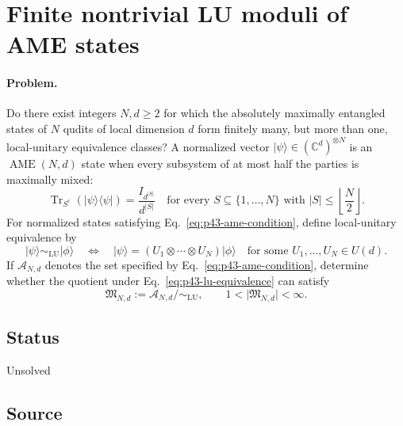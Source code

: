\section{Finite nontrivial LU moduli of AME states}
\label{sec:op_0c86d9293aba3b01}

\paragraph{Problem.}
Do there exist integers $N,d\geq 2$ for which the absolutely maximally
entangled states of $N$ qudits of local dimension $d$ form finitely many, but
more than one, local-unitary equivalence classes?  A normalized vector
$|\psi\rangle\in(\mathbb{C}^{d})^{\otimes N}$ is an $\operatorname{AME}(N,d)$
state when every subsystem of at most half the parties is maximally mixed:
\begin{equation}
  \operatorname{Tr}_{S^{c}}\!\left(|\psi\rangle\!\langle\psi|\right)
  =\frac{I_{d^{|S|}}}{d^{|S|}}
  \quad\text{for every }S\subseteq\{1,\ldots,N\}
  \text{ with }|S|\leq\left\lfloor\frac{N}{2}\right\rfloor .
  \label{eq:p43-ame-condition}
\end{equation}
For normalized states satisfying Eq.~\eqref{eq:p43-ame-condition}, define
local-unitary equivalence by
\begin{equation}
  |\psi\rangle\sim_{\mathrm{LU}}|\phi\rangle
  \quad\Longleftrightarrow\quad
  |\psi\rangle=(U_1\otimes\cdots\otimes U_N)|\phi\rangle
  \quad\text{for some }U_1,\ldots,U_N\in U(d).
  \label{eq:p43-lu-equivalence}
\end{equation}
If $\mathcal{A}_{N,d}$ denotes the set specified by
Eq.~\eqref{eq:p43-ame-condition}, determine whether the quotient under
Eq.~\eqref{eq:p43-lu-equivalence} can satisfy
\begin{equation}
  \mathfrak{M}_{N,d}:=\mathcal{A}_{N,d}/\!\sim_{\mathrm{LU}},
  \qquad
  1<\lvert\mathfrak{M}_{N,d}\rvert<\infty .
  \label{eq:p43-finite-nontrivial-moduli}
\end{equation}

\subsection*{Status}

Unsolved

\subsection*{Source}

